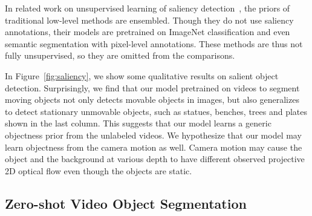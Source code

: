 In related work on unsupervised learning of saliency detection~\cite{zhang2018deep,zeng2019multi,nguyen2019deepusps}, the priors of traditional low-level methods are ensembled.
Though they do not use saliency annotations, their models are pretrained on ImageNet classification and even semantic segmentation with pixel-level annotations. These methods are thus not fully unsupervised, so they are omitted from the comparisons.

In Figure~\ref{fig:saliency}, we show some qualitative results on salient object detection.
Surprisingly, we find that our model pretrained on videos to segment moving objects not only detects movable objects in images, but also generalizes to detect stationary unmovable objects, such as statues, benches, trees and plates shown in the last column. This suggests that our model learns a generic objectness prior from the unlabeled videos.
We hypothesize that our model may learn objectness from the camera motion as well. Camera motion may cause the object and the background at various depth to have different observed projective 2D optical flow even though the objects are static.



\subsection{Zero-shot Video Object Segmentation}
\label{sec:vos}



